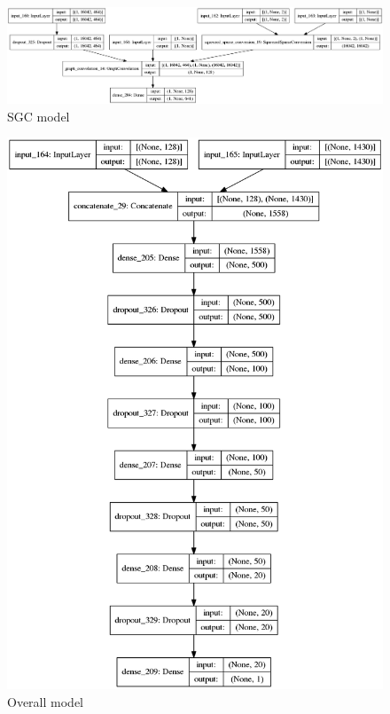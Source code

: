 \documentclass[10pt]{beamer}
\begin{document}
\begin{frame}
	\begin{figure}
		\includegraphics[width=\linewidth]{../../models/sgc_model.png}
		\caption{SGC model}
	\end{figure}
\end{frame}

\begin{frame}
	\begin{figure}
		\includegraphics[height=0.9\textheight]{../../models/overall_model.png}
		\caption{Overall model}
	\end{figure}
\end{frame}
\end{document}
